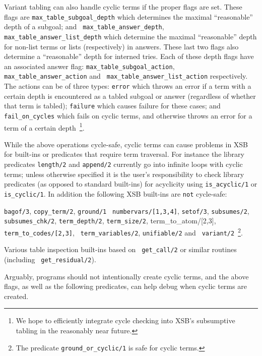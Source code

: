     Variant tabling can also handle cyclic terms if the proper flags
    are set.  These flags are {\tt max\_table\_subgoal\_depth} which
    determines the maximal ``reasonable'' depth of a subgoal; and {\tt
      max\_table\_answer\_depth}, {\tt
      max\_table\_answer\_list\_depth} which determine the maximal
    ``reasonable'' depth for non-list terms or lists (respectively) in
    answers.  These last two flags also determine a ``reasonable''
    depth for interned tries.  Each of these depth flags have an
    associated answer flag: {\tt max\_table\_subgoal\_action}, {\tt
      max\_table\_answer\_action} and {\tt
      max\_table\_answer\_list\_action} respectively.  The actions can
    be of three types: {\tt error} which throws an error if a term
    with a certain depth is encountered as a tabled subgoal or answer
    (regardless of whether that term is tabled); {\tt failure} which
    causes failure for these cases; and {\tt fail\_on\_cycles} which
    fails on cyclic terms, and otherwise throws an error for a term of
    a certain depth~\footnote{We hope to efficiently integrate cycle
      checking into XSB's subsumptive tabling in the reasonably near
      future.}.

    While the above operations cycle-safe, cyclic terms can cause
    problems in XSB for built-ins or predicates that require term
    traversal.  For instance the library predicates {\tt length/2} and
    {\tt append/2} currently go into infinite loops with cyclic terms;
    unless otherwise specified it is the user's responsibility to
    check library predicates (as opposed to standard built-ins) for
    acyclicity using {\tt is\_acyclic/1} or {\tt is\_cyclic/1}.  In
    addition the following XSB built-ins are {\tt not} cycle-safe:

\bi
\item {\tt bagof/3}, {\tt copy\_term/2}, {\tt ground/1} {\tt
  numbervars/[1,3,4]}, {\tt setof/3}, {\tt subsumes/2}, {\tt
  subsumes\_chk/2}, {\tt term\_depth/2}, {\tt term\_size/2},
  {term\_to\_atom/[2,3]}, {\tt term\_to\_codes/[2,3]}, {\tt
    term\_variables/2}, {\tt unifiable/2} and {\tt
    variant/2}~\footnote{The predicate {\tt ground\_or\_cyclic/1} is
      safe for cyclic terms.}.
%
\item Various table inspection built-ins based on {\tt
        get\_call/2} or similar routines (including {\tt
        get\_residual/2}).
\ei

    Arguably, programs should not intentionally create cyclic terms,
    and the above flags, as well as the following predicates, can help
    debug when cyclic terms are created.

